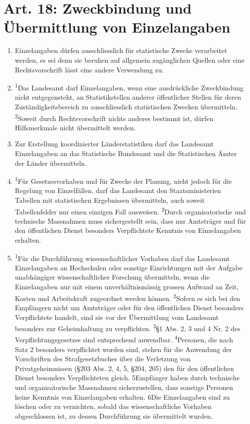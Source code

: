     \section{Art. 18: Zweckbindung und Übermittlung von Einzelangaben}
        \begin{enumerate}[label=(\arabic*)]
            \item Einzelangaben dürfen ausschliesslich für statistische Zwecke verarbeitet werden, es sei denn sie beruhen auf allgemein zugänglichen Quellen oder eine Rechtsvorschrift lässt eine andere Verwendung zu.
            \item \textsuperscript{1}Das Landesamt darf Einzelangaben, wenn eine ausdrückliche Zweckbindung nicht entgegensteht, an Statistikstellen anderer öffentlicher Stellen für deren Zuständig\-keitsbereich zu ausschliesslich statistischen Zwecken übermitteln. \textsuperscript{2}Soweit durch Rechtsvorschrift nichts anderes bestimmt ist, dürfen Hilfsmerkmale nicht über\-mit\-telt werden.
            \item Zur Erstellung koordinierter Länderstatistiken darf das Landesamt Einzel\-an\-ga\-ben an das Statistische Bundesamt und die Statistischen Ämter der Länder über\-mitteln.
            \item \textsuperscript{1}Für Gesetzesvorhaben und für Zwecke der Planung, nicht jedoch für die Regelung von Einzelfällen, darf das Landesamt den Staatsministerien Tabellen mit statistischen Ergebnissen übermitteln, auch soweit Tabellenfelder nur einen einzigen Fall ausweisen. \textsuperscript{2}Durch organisatorische und technische Massnahmen muss sichergestellt sein, dass nur Amtsträger und für den öffentlichen Dienst besonders Verpflichtete Kenntnis von Einzelangaben erhalten.
            \item \textsuperscript{1}Für die Durchführung wissenschaftlicher Vorhaben darf das Landesamt Einzelangaben an Hochschulen oder sonstige Einrichtungen mit der Aufgabe unabhängiger wissenschaftlicher Forschung übermitteln, wenn die Einzelangaben nur mit einem unverhältnismässig grossen Aufwand an Zeit, Kosten und Arbeitskraft zugeordnet werden können. \textsuperscript{2}Sofern es sich bei den Empfängern nicht um Amtsträger oder für den öffentlichen Dienst besonders Verpflichtete handelt, sind sie vor der Übermittlung vom Landesamt besonders zur Geheimhaltung zu verpflichten. \textsuperscript{3}\S 1 Abs. 2, 3 und 4 Nr. 2 des Verpflichtungsgesetzes sind entsprechend anwendbar. \textsuperscript{4}Personen, die nach Satz 2 besonders verpflichtet worden sind, stehen für die Anwendung der Vorschriften des Strafgesetzbuches über die Verletzung von Privatgeheimnissen (\S 203 Abs. 2, 4, 5, \S 204, 205) den für den öffentlichen Dienst besonders Verpflichteten gleich. 5Empfänger haben durch technische und organisatorische Massnahmen sicherzustellen, dass sonstige Personen keine Kenntnis von Einzelangaben erhalten. 6Die Einzelangaben sind zu löschen oder zu vernichten, sobald das wissenschaftliche Vorhaben abgeschlossen ist, zu dessen Durchführung sie übermittelt wurden.

\end{enumerate}
